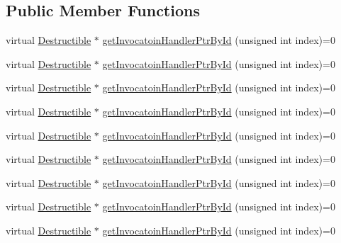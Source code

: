 \subsection*{Public Member Functions}
\begin{DoxyCompactItemize}
\item 
virtual \mbox{\hyperlink{classfakeit_1_1Destructible}{Destructible}} $\ast$ \mbox{\hyperlink{structfakeit_1_1InvocationHandlerCollection_aa0bb622369d838f8c4daa93a8b992b57}{get\+Invocatoin\+Handler\+Ptr\+By\+Id}} (unsigned int index)=0
\item 
virtual \mbox{\hyperlink{classfakeit_1_1Destructible}{Destructible}} $\ast$ \mbox{\hyperlink{structfakeit_1_1InvocationHandlerCollection_aa0bb622369d838f8c4daa93a8b992b57}{get\+Invocatoin\+Handler\+Ptr\+By\+Id}} (unsigned int index)=0
\item 
virtual \mbox{\hyperlink{classfakeit_1_1Destructible}{Destructible}} $\ast$ \mbox{\hyperlink{structfakeit_1_1InvocationHandlerCollection_aa0bb622369d838f8c4daa93a8b992b57}{get\+Invocatoin\+Handler\+Ptr\+By\+Id}} (unsigned int index)=0
\item 
virtual \mbox{\hyperlink{classfakeit_1_1Destructible}{Destructible}} $\ast$ \mbox{\hyperlink{structfakeit_1_1InvocationHandlerCollection_aa0bb622369d838f8c4daa93a8b992b57}{get\+Invocatoin\+Handler\+Ptr\+By\+Id}} (unsigned int index)=0
\item 
virtual \mbox{\hyperlink{classfakeit_1_1Destructible}{Destructible}} $\ast$ \mbox{\hyperlink{structfakeit_1_1InvocationHandlerCollection_aa0bb622369d838f8c4daa93a8b992b57}{get\+Invocatoin\+Handler\+Ptr\+By\+Id}} (unsigned int index)=0
\item 
virtual \mbox{\hyperlink{classfakeit_1_1Destructible}{Destructible}} $\ast$ \mbox{\hyperlink{structfakeit_1_1InvocationHandlerCollection_aa0bb622369d838f8c4daa93a8b992b57}{get\+Invocatoin\+Handler\+Ptr\+By\+Id}} (unsigned int index)=0
\item 
virtual \mbox{\hyperlink{classfakeit_1_1Destructible}{Destructible}} $\ast$ \mbox{\hyperlink{structfakeit_1_1InvocationHandlerCollection_aa0bb622369d838f8c4daa93a8b992b57}{get\+Invocatoin\+Handler\+Ptr\+By\+Id}} (unsigned int index)=0
\item 
virtual \mbox{\hyperlink{classfakeit_1_1Destructible}{Destructible}} $\ast$ \mbox{\hyperlink{structfakeit_1_1InvocationHandlerCollection_aa0bb622369d838f8c4daa93a8b992b57}{get\+Invocatoin\+Handler\+Ptr\+By\+Id}} (unsigned int index)=0
\item 
virtual \mbox{\hyperlink{classfakeit_1_1Destructible}{Destructible}} $\ast$ \mbox{\hyperlink{structfakeit_1_1InvocationHandlerCollection_aa0bb622369d838f8c4daa93a8b992b57}{get\+Invocatoin\+Handler\+Ptr\+By\+Id}} (unsigned int index)=0
\end{DoxyCompactItemize}
